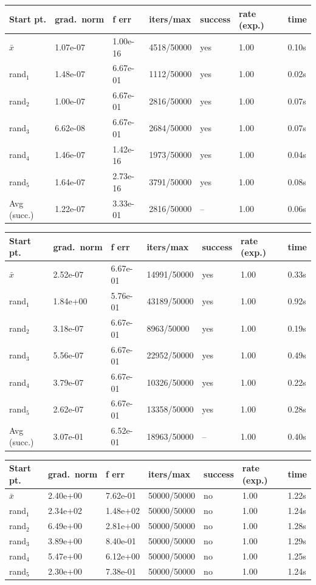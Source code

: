 \begin{tabular}{lllllll}
\toprule
Start pt. & grad.\ norm & f err & iters/max & success & rate (exp.) & time \\
\midrule
\(\bar{x}\) & 1.07e-07 & 1.00e-16 & 4518/50000 & yes & 1.00 & 0.10s \\
rand$_{1}$ & 1.48e-07 & 6.67e-01 & 1112/50000 & yes & 1.00 & 0.02s \\
rand$_{2}$ & 1.00e-07 & 6.67e-01 & 2816/50000 & yes & 1.00 & 0.07s \\
rand$_{3}$ & 6.62e-08 & 6.67e-01 & 2684/50000 & yes & 1.00 & 0.07s \\
rand$_{4}$ & 1.46e-07 & 1.42e-16 & 1973/50000 & yes & 1.00 & 0.04s \\
rand$_{5}$ & 1.64e-07 & 2.73e-16 & 3791/50000 & yes & 1.00 & 0.08s \\
\midrule
Avg (succ.) & 1.22e-07 & 3.33e-01 & 2816/50000 & -- & 1.00 & 0.06s \\
\bottomrule
\end{tabular}

\begin{tabular}{lllllll}
\toprule
Start pt. & grad.\ norm & f err & iters/max & success & rate (exp.) & time \\
\midrule
\(\bar{x}\) & 2.52e-07 & 6.67e-01 & 14991/50000 & yes & 1.00 & 0.33s \\
rand$_{1}$ & 1.84e+00 & 5.76e-01 & 43189/50000 & yes & 1.00 & 0.92s \\
rand$_{2}$ & 3.18e-07 & 6.67e-01 & 8963/50000 & yes & 1.00 & 0.19s \\
rand$_{3}$ & 5.56e-07 & 6.67e-01 & 22952/50000 & yes & 1.00 & 0.49s \\
rand$_{4}$ & 3.79e-07 & 6.67e-01 & 10326/50000 & yes & 1.00 & 0.22s \\
rand$_{5}$ & 2.62e-07 & 6.67e-01 & 13358/50000 & yes & 1.00 & 0.28s \\
\midrule
Avg (succ.) & 3.07e-01 & 6.52e-01 & 18963/50000 & -- & 1.00 & 0.40s \\
\bottomrule
\end{tabular}

\begin{tabular}{lllllll}
\toprule
Start pt. & grad.\ norm & f err & iters/max & success & rate (exp.) & time \\
\midrule
\(\bar{x}\) & 2.40e+00 & 7.62e-01 & 50000/50000 & no & 1.00 & 1.22s \\
rand$_{1}$ & 2.34e+02 & 1.48e+02 & 50000/50000 & no & 1.00 & 1.24s \\
rand$_{2}$ & 6.49e+00 & 2.81e+00 & 50000/50000 & no & 1.00 & 1.28s \\
rand$_{3}$ & 3.89e+00 & 8.40e-01 & 50000/50000 & no & 1.00 & 1.29s \\
rand$_{4}$ & 5.47e+00 & 6.12e+00 & 50000/50000 & no & 1.00 & 1.25s \\
rand$_{5}$ & 2.30e+00 & 7.38e-01 & 50000/50000 & no & 1.00 & 1.24s \\
\bottomrule
\end{tabular}


